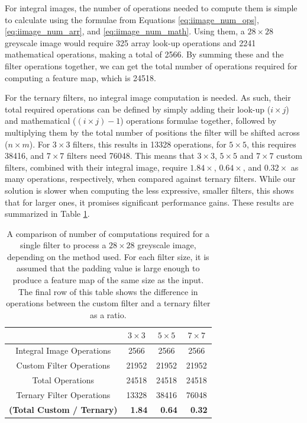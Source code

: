 \documentclass[11pt,a4paper,oldfontcommands]{memoir}
\begin{document}
For integral images, the number of operations needed to compute them is simple to calculate using the formulae from Equations \ref{eq:iimage_num_ops}, \ref{eq:iimage_num_arr}, and \ref{eq:iimage_num_math}. Using them, a $28 \times 28$ greyscale image would require 325 array look-up operations and 2241 mathematical operations, making a total of 2566. By summing these and the filter operations together, we can get the total number of operations required for computing a feature map, which is 24518.

For the ternary filters, no integral image computation is needed. As such, their total required operations can be defined by simply adding their look-up ($i \times j$)  and mathematical ($(i \times j) - 1$) operations formulae together, followed by multiplying them by the total number of positions the filter will be shifted across ($n \times m$). For $3 \times 3$ filters, this results in 13328 operations, for $5 \times 5$, this requires 38416, and $7 \times 7$ filters need 76048. This means that $3 \times 3$, $5 \times 5$ and $7 \times 7$ custom filters, combined with their integral image, require $1.84\times$, $0.64\times$, and $0.32\times$ as many operations, respectively, when compared against ternary filters. While our solution is slower when computing the less expressive, smaller filters, this shows that for larger ones, it promises significant performance gains. These results are summarized in Table \ref{tab:res_comparison}.

\begin{table}
\centering
    \begin{tabular}{|c c c c|} 
        \hline
         & $3 \times 3$ & $5 \times 5$ & $7 \times 7$ \\ 
        \hline
        Integral Image Operations & 2566 & 2566 & 2566 \\
        Custom Filter Operations & 21952 & 21952 & 21952 \\
        Total Operations & 24518 & 24518 & 24518 \\
        \hline
        Ternary Filter Operations & 13328 & 38416 & 76048 \\
        \hline
        \textbf{(Total Custom / Ternary)} & \textbf{~1.84} & \textbf{~0.64} & \textbf{~0.32} \\
        \hline
    \end{tabular}
\caption{A comparison of number of computations required for a single filter to process a $28 \times 28$ greyscale image, depending on the method used. For each filter size, it is assumed that the padding value is large enough to produce a feature map of the same size as the input. The final row of this table shows the difference in operations between the custom filter and a ternary filter as a ratio.}
\label{tab:res_comparison}
\end{table}
\end{document}
